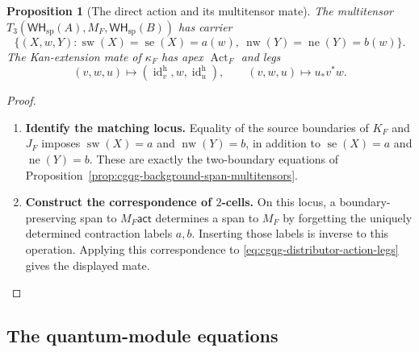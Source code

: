 \documentclass[oneside]{article}
\newcommand{\WH}{\mathsf{WH}}
\newcommand{\id}{\operatorname{id}}
\newcommand{\act}{\mathsf{act}}
\newcommand{\boxnw}[1]{\operatorname{nw}(#1)}
\newcommand{\boxne}[1]{\operatorname{ne}(#1)}
\newcommand{\boxsw}[1]{\operatorname{sw}(#1)}
\newcommand{\boxse}[1]{\operatorname{se}(#1)}
\theoremstyle{plain}
\newtheorem{proposition}[theorem]{Proposition}
\theoremstyle{definition}
\theoremstyle{remark}
\begin{document}
\begin{proposition}[The direct action and its multitensor mate]
\label{prop:cgqg-direct-action-mate}
The multitensor \(T_3(\WH_{\mathrm{sp}}(A),M_F,\WH_{\mathrm{sp}}(B))\) has carrier
\[
 \{(X,w,Y):\boxsw{X}=\boxse{X}=a(w),\ \boxnw{Y}=\boxne{Y}=b(w)\}.
\]
The Kan-extension mate of \(\kappa_F\) has apex \(\operatorname{Act}_F\)
and legs
\[
 (v,w,u)\longmapsto(\id_v^{\mathrm h},w,\id_u^{\mathrm h}),\qquad
 (v,w,u)\longmapsto u_*v^*w.
\]
\end{proposition}
\begin{proof}
    \leavevmode
    \begin{enumerate}[beginpenalty=10000]
        \item \textbf{Identify the matching locus.}
        Equality of the source boundaries of \(K_F\) and \(J_F\)
        imposes \(\boxsw{X}=a\) and \(\boxnw{Y}=b\), in addition to
        \(\boxse{X}=a\) and \(\boxne{Y}=b\). These are exactly the two-boundary
        equations of Proposition~\ref{prop:cgqg-background-span-multitensors}.

        \item \textbf{Construct the correspondence of \(2\)-cells.}
        On this locus, a boundary-preserving span to \(M_F\act\)
        determines a span to \(M_F\) by forgetting the uniquely determined
        contraction labels \(a,b\). Inserting those labels is inverse
        to this operation. Applying this correspondence to
        \eqref{eq:cgqg-distributor-action-legs} gives the displayed mate. \qedhere
    \end{enumerate}
\end{proof}

\subsection{The quantum-module equations}
\end{document}
